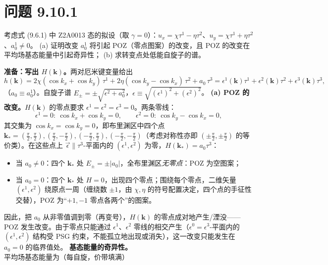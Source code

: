 \section*{问题 9.10.1}
\begin{problem}
考虑式 (9.6.1) 中 Z2A0013 态的拟设（取 $\gamma=0$）：$u_x=\chi\tau^1-\eta\tau^2$、$u_y=\chi\tau^1+\eta\tau^2$、$a_0^1\neq0$。
(a) 证明改变 $a_0^1$ 将引起 POZ（零点图案）的改变，且 POZ 的改变在平均场基态能量中引起奇异性；
(b) 求转变点处低能自旋子的谱。
\end{problem}
\solution
\textbf{准备：写出 $H(\pmb{k})$。}两对厄米键变量给出
\begin{equation*}
h(\pmb{k})=2\chi(\cos k_x+\cos k_y)\,\tau^{1}+2\eta(\cos k_y-\cos k_x)\,\tau^{2}+a_0\,\tau^{3}
=\epsilon^{1}(\pmb{k})\tau^{1}+\epsilon^{2}(\pmb{k})\tau^{2}+\epsilon^{3}(\pmb{k})\tau^{3},
\end{equation*}
（$a_0\equiv a_0^1$）。自旋子谱 $E_{\pm}=\pm\sqrt{\epsilon^{2}+a_0^{2}}$，$\epsilon\equiv\sqrt{(\epsilon^{1})^{2}+(\epsilon^{2})^{2}}$。
\textbf{(a) POZ 的改变。}$H(\pmb{k})$ 的零点要求 $\epsilon^{1}=\epsilon^{2}=\epsilon^{3}=0$。两条零线：
\begin{equation*}
\epsilon^{1}=0:\ \cos k_x+\cos k_y=0,\qquad
\epsilon^{2}=0:\ \cos k_y-\cos k_x=0 ,
\end{equation*}
其交集为 $\cos k_x=\cos k_y=0$，即布里渊区中四个点 $\pmb{k}_{*}=(\tfrac{\pi}{2},\tfrac{\pi}{2}),(\tfrac{\pi}{2},-\tfrac{\pi}{2}),(-\tfrac{\pi}{2},\tfrac{\pi}{2}),(-\tfrac{\pi}{2},-\tfrac{\pi}{2})$（考虑对称性亦即 $(\pm\tfrac{\pi}{2},\pm\tfrac{\pi}{2})$ 的等价类）。在这些点上 $\vec\epsilon\parallel\tau^3$-平面内的 $(\epsilon^{1},\epsilon^{2})$ 为零，$H(\pmb{k}_{*})=a_0\tau^{3}$：
\begin{itemize}
\item 当 $a_0\neq0$：四个 $\pmb{k}_*$ 处 $E_{\pm}=\pm|a_0|$，全布里渊区\emph{无零点}：POZ 为空图案；
\item 当 $a_0=0$：四个 $\pmb{k}_*$ 处 $H=0$，出现四个零点；围绕每个零点，二维矢量 $(\epsilon^{1},\epsilon^{2})$ 绕原点一周（缠绕数 $\pm1$，由 $\chi,\eta$ 的符号配置决定，四个点的手征性交替），POZ 为“$+1,-1$ 零点各两个”的图案。
\end{itemize}
因此，把 $a_0$ 从非零值调到零（再变号），$H(\pmb{k})$ 的零点成对地产生/湮没——POZ 发生改变。由于零点只能通过 $\epsilon^{1}$、$\epsilon^{2}$ 零线的相交产生（$\epsilon^{0}=\epsilon^{3}$-平面内的 $(\epsilon^{1},\epsilon^{2})$ 结构受 PSG 约束，不能孤立地出现或消失），这一改变只能发生在 $a_0=0$ 的临界值处。
\textbf{基态能量的奇异性。}平均场基态能量为（每自旋，价带填满）
